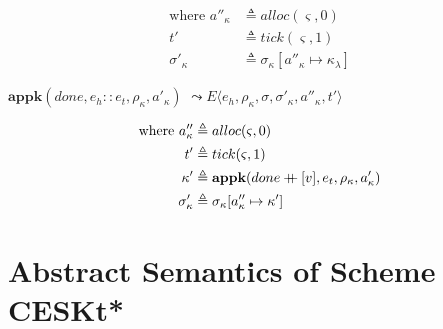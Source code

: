 \documentclass[12pt,draft]{article}
\newcommand\mdoubleplus{\ensuremath{\mathbin{+\mkern-9mu+}}}
\begin{document}
\begin{multicols*}{2}
\begin{center}
\end{center}
\vspace{-7mm}
\begin{align*}
  \text{where }
  a''_\kappa &\triangleq alloc(\varsigma, 0) \\
  t' &\triangleq tick(\varsigma, 1) \\
  \sigma'_\kappa &\triangleq \sigma_\kappa[a''_\kappa \mapsto \kappa_\lambda]
\end{align*}
\begin{center}
  $\textbf{appk}(done, e_h::e_t, \rho_\kappa, a'_\kappa)$
  $\leadsto E\langle e_h , \rho_\kappa , \sigma ,\sigma'_\kappa,a''_\kappa,t' \rangle$
\end{center}
\vspace{-7mm}
\begin{align*}
  \text{where }
  a''_\kappa &\triangleq alloc(\varsigma, 0) \\
  t' &\triangleq tick(\varsigma, 1) \\
  \kappa' &\triangleq \textbf{appk}(done \mdoubleplus [v] , e_t , \rho_\kappa , a'_\kappa) \\
  \sigma'_\kappa &\triangleq \sigma_\kappa[a''_\kappa \mapsto \kappa']
\end{align*}
\end{multicols*}



\newpage
\section{Abstract Semantics of Scheme CESKt*}
\end{document}
